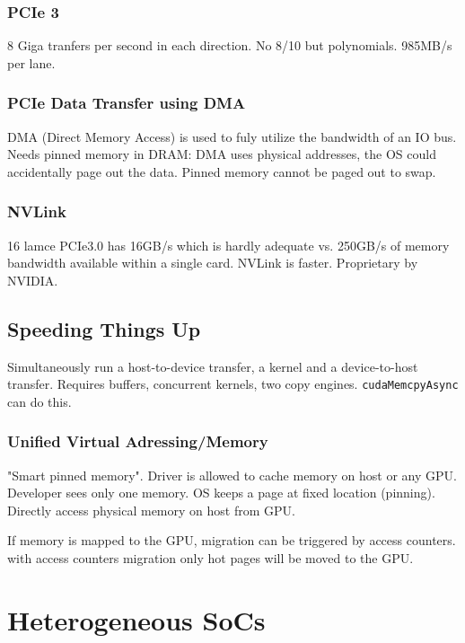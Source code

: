 \documentclass[a4paper, fontsize=8pt, landscape, DIV=1]{scrartcl}
\begin{document}
\begin{multicols*}{4}
  \subsubsection{PCIe 3}
  8 Giga tranfers per second in each direction. No 8/10 but polynomials. 985MB/s per lane.

  \subsubsection{PCIe Data Transfer using DMA}
  DMA (Direct Memory Access) is used to fuly utilize the bandwidth of an IO bus. Needs pinned memory in DRAM:
  DMA uses physical addresses, the OS could accidentally page out the data. Pinned memory cannot be
  paged out to swap. 
  
  \subsubsection{NVLink}
  16 lamce PCIe3.0 has 16GB/s which is hardly adequate vs. 250GB/s of memory bandwidth available within
  a single card. NVLink is faster. Proprietary by NVIDIA.

  \subsection{Speeding Things Up}
  Simultaneously run a host-to-device transfer, a kernel and a device-to-host transfer. Requires buffers, 
  concurrent kernels, two copy engines. \texttt{cudaMemcpyAsync} can do this.

  \subsubsection{Unified Virtual Adressing/Memory}
  "Smart pinned memory". Driver is allowed to cache memory on host or any GPU. Developer sees only one memory.
  OS keeps a page at fixed location (pinning). Directly access physical memory on host from GPU. 

  If memory is mapped to the GPU, migration can be triggered by access counters. with access counters
  migration only hot pages will be moved to the GPU.

  \section{Heterogeneous SoCs}


\end{multicols*}
\end{document}
